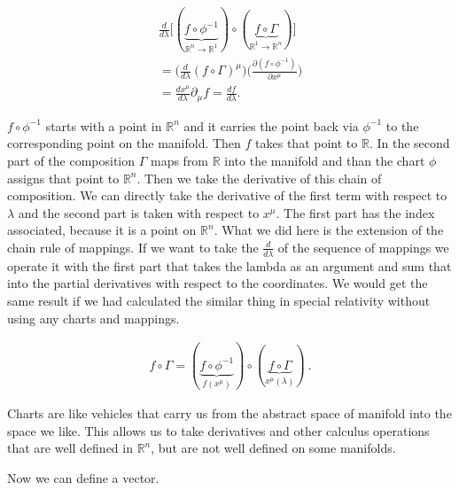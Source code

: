 \documentclass[11pt]{article}
\begin{document}
\begin{equation} 
\begin{aligned}
\frac{d}{d\lambda}\Big[(\underbrace{f \circ \phi^{-1}}_{\mathbb{R}^n \rightarrow \mathbb{R}^1})\circ (\underbrace{f \circ \Gamma}_{\mathbb{R}^1 \rightarrow \mathbb{R}^n})\Big] \\
=\Bigg(\frac{d}{d\lambda}(f \circ \Gamma)^\mu\Bigg)\Bigg(\frac{\partial(f \circ \phi^{-1})}{\partial x^\mu}\Bigg)  \\
=\frac{dx^\mu}{d\lambda} \partial_\mu f = \frac{df}{d\lambda} .
\end{aligned}
\label{directional}
\end{equation}

$f \circ \phi^{-1}$ starts with a point in $\mathbb{R}^n$ and it carries the point back via $\phi^{-1}$ to the corresponding point on the manifold. Then $f$ takes that point to $\mathbb{R}$. In the second part of the composition $\Gamma$ maps from $\mathbb{R}$ into the manifold and than the chart $\phi$ assigns that point to $\mathbb{R}^n$. Then we take the derivative of this chain of composition. We can directly take the derivative of the first term with respect to $\lambda$ and the second part is taken with respect to $x^\mu$. The first part has the index associated, because it is a point on $\mathbb{R}^n$. What we did here is the extension of the chain rule of mappings. If we want to take the $\frac{d}{d\lambda}$ of the sequence of mappings we operate it with the first part that takes the lambda as an argument and sum that into the partial derivatives with respect to the coordinates. We would get the same result if we had calculated the similar thing in special relativity without using any charts and mappings.

\begin{align*}
f \circ \Gamma = (\underbrace{f \circ \phi^{-1}}_{f(x^\mu)})\circ (\underbrace{f \circ \Gamma}_{x^\mu(\lambda)}) \ .
\end{align*}

Charts are like vehicles that carry us from the abstract space of manifold into the space we like. This allows us to take derivatives and other calculus operations that are well defined in $\mathbb{R}^n$, but are not well defined on some manifolds.

\pagebreak


Now we can define a vector. 
\end{document}
